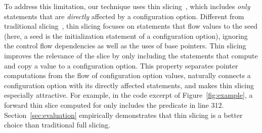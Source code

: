

To address this limitation, our technique uses thin
slicing~\cite{Sridharan:2007}, which includes
\textit{only} statements that are \textit{directly} affected by a configuration option.
Different from traditional slicing~\cite{Horwitz:1988}, thin slicing
focuses on statements that flow values to the seed (here, a
seed is the initialization statement of a configuration option), ignoring the 
control flow dependencies as well as the uses of
base pointers. Thin slicing improves the relevance
of the slice by only including the statements that compute
and copy a value to a configuration option.
This property separates
pointer computations from the flow of configuration option values,
naturally connects a configuration option with its
directly affected statements, and makes thin slicing
especially attractive.
For example, in the code excerpt of
Figure~\ref{fig:example},
a forward thin slice computed for 
only includes the predicate in line 312.
Section~\ref{sec:evaluation} 
empirically demonstrates that thin slicing
is a better choice than traditional full slicing.




% 
